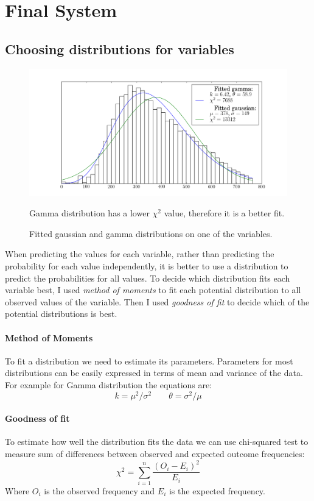 \documentclass[12pt,a4paper]{book}
\newcommand\note[1]{\vspace*{-0.5\baselineskip}\caption*{#1}}
\begin{document}
\section{Final System}
\subsection{Choosing distributions for variables}
\begin{figure}[ht]
\centering
\includegraphics[scale=0.5]{fitted-distributions}
\caption{Fitted gaussian and gamma distributions on one of the variables.}
\note{Gamma distribution has a lower $\chi^2$ value, therefore it is a better fit.}
\label{fig:fitted-distributions}
\end{figure}
When predicting the values for each variable, rather than predicting the probability for each value independently, it is better to use a distribution to predict the probabilities for all values.
To decide which distribution fits each variable best, I used \emph{method of moments} to fit each potential distribution to all observed values of the variable.
Then I used \emph{goodness of fit} to decide which of the potential distributions is best.
\paragraph{Method of Moments}
To fit a distribution we need to estimate its parameters.
Parameters for most distributions can be easily expressed in terms of mean and variance of the data.
For example for Gamma distribution the equations are:
\begin{equation}
k= \mu^2/\sigma^2
\qquad
\theta = \sigma^2/\mu
\end{equation}
\paragraph{Goodness of fit}
To estimate how well the distribution fits the data we can use chi-squared test to measure sum of differences between observed and expected outcome frequencies:
\begin{equation}
\chi^2 = \sum_{i=1}^{n} \frac{(O_i - E_i)^2}{E_i}
\end{equation}
Where $O_i$ is the observed frequency and $E_i$ is the expected frequency.
\end{document}
